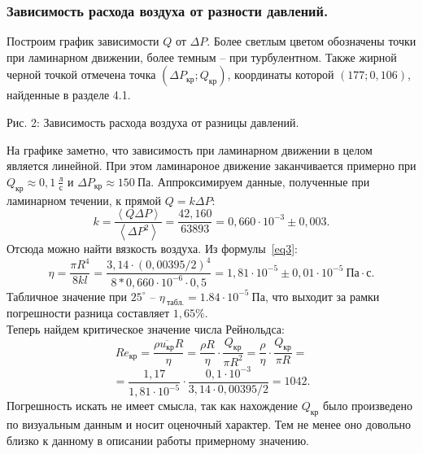 \documentclass[a4paper,11pt]{article}
\begin{document}
\subsubsection{Зависимость расхода воздуха от разности давлений.}
Построим график зависимости $Q$ от $\Delta P$. Более светлым цветом обозначены точки при ламинарном движении, более темным -- при турбулентном. Также жирной черной точкой отмечена точка $(\Delta P_{кр}; Q_{кр})$, координаты которой $(177;0,106)$, найденные в разделе 4.1.
\begin{center}
\newline
Рис. 2: Зависимость расхода воздуха от разницы давлений.
\end{center}
На графике заметно, что зависимость при ламинарном движении в целом является линейной. При этом ламинароное движение заканчивается примерно при $Q_{кр} \approx 0,1\ \frac{л}{с}$ и  $\Delta P_{кр} \approx 150\ Па$. Аппроксимируем данные, полученные при ламинарном течении, к прямой $Q = k \Delta P$:
$$k = \frac{\left< Q \Delta P\right>}{\left<\Delta P^{2}\right>} = \frac{42,160}{63893} = 0,660 \cdot 10^{-3} \pm 0,003.$$
Отсюда можно найти вязкость воздуха. Из формулы~\ref{eq3}:
$$\eta = \frac{\pi R^{4}}{8kl} = \frac{3,14 \cdot (0,00395/2)^{4}}{8 * 0,660 \cdot 10^{-6} \cdot 0,5} = 1,81 \cdot 10^{-5} \pm 0,01 \cdot 10^{-5}\ Па \cdot с.$$
Табличное значение при $25^{\circ}$ -- $\eta_{\ табл.} = 1.84 \cdot 10^{-5}\ Па$, что выходит за рамки погрешности разница составляет $1,65 \%$.\\
Теперь найдем критическое значение числа Рейнольдса:
$$Re_{кр} = \frac{\rho \overline{u_{кр}} R}{\eta} = \frac{\rho R}{\eta} \cdot \frac{Q_{кр}}{\pi R^{2}} = \frac{\rho}{\eta} \cdot \frac{Q_{кр}}{\pi R} = $$
$$ = \frac{1,17}{1,81 \cdot 10^{-5}} \cdot \frac{0,1 \cdot 10^{-3}}{3,14 \cdot 0,00395 / 2} = 1042.$$
Погрешность искать не имеет смысла, так как нахождение $Q_{кр}$ было произведено по визуальным данным и носит оценочный характер. Тем не менее оно довольно близко к данному в описании работы примерному значению.
\end{document}

